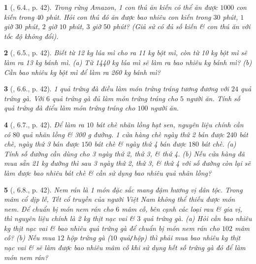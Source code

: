 \documentclass{article}
\newtheorem{baitoan}{}
\begin{document}
\begin{baitoan}[\cite{Binh_boi_duong_Toan_7_tap_1}, 6.4., p. 42]
	Trong rừng Amazon, 1 con thú ăn kiến có thể ăn được $1000$ con kiến trong $40$ phút. Hỏi con thú đó ăn được bao nhiêu con kiến trong $30$ phút, $1$ giờ $30$ phút, $2$ giờ $10$ phút, $3$ giờ $50$ phút? (Giả sử có đủ số kiến \& con thú ăn với tốc độ không đổi).
\end{baitoan}

\begin{baitoan}[\cite{Binh_boi_duong_Toan_7_tap_1}, 6.5., p. 42]
	Biết từ {\rm12 kg} lúa mì cho ra {\rm11 kg} bột mì, còn từ {\rm10 kg} bột mì sẽ làm ra {\rm13 kg} bánh mì. (a) Từ {\rm1440 kg} lúa mì sẽ làm ra bao nhiêu {\rm kg} bánh mì? (b) Cần bao nhiêu {\rm kg} bột mì để làm ra {\rm260 kg} bánh mì?
\end{baitoan}

\begin{baitoan}[\cite{Binh_boi_duong_Toan_7_tap_1}, 6.6., p. 42]
	1 quả trứng đà điều làm món trứng tráng tương đương với $24$ quả trứng gà. Với $6$ quả trứng gà đủ làm món trứng tráng cho $5$ người ăn. Tính số quả trứng đà điểu làm món trứng tráng cho $100$ người ăn.
\end{baitoan}

\begin{baitoan}[\cite{Binh_boi_duong_Toan_7_tap_1}, 6.7., p. 42]
	Để làm ra $10$ bát chè nhãn lồng hạt sen, nguyên liệu chính cần có $80$ quả nhãn lồng \& {\rm300 g} đường. 1 cửa hàng chè ngày thứ 2 bán được $240$ bát chè, ngày thứ 3 bán được $150$ bát chè \& ngày thứ 4 bán được $180$ bát chè. (a) Tính số đường cần dùng cho 3 ngày thứ 2, thứ 3, \& thứ 4. (b) Nếu cửa hàng đã mua sẵn {\rm21 kg} đường thì sau 3 ngày thứ 2, thứ 3, \& thứ 4 với số đường còn lại sẽ làm được bao nhiêu bát chè \& cần sử dụng bao nhiêu quả nhãn lồng?
\end{baitoan}

\begin{baitoan}[\cite{Binh_boi_duong_Toan_7_tap_1}, 6.8., p. 42]
	Nem rán là 1 món đặc sắc mang đậm hương vị dân tộc. Trong mâm cổ dịp lễ, Tết cổ truyền của người Việt Nam không thể thiếu được món nem. Để chuẩn bị món nem rán cho $6$ mâm cỗ, bên cạnh các loại rau \& gia vị, thì nguyên liệu chính là {\rm2 kg} thịt nạc vai \& $3$ quả trứng gà. (a) Hỏi cần bao nhiêu {\rm kg} thịt nạc vai \& bao nhiêu quả trứng gà để chuẩn bị món nem rán cho $102$ mâm cỗ? (b) Nếu mua $12$ hộp trứng gà ($10$ quả{\tt/}hộp) thì phải mua bao nhiêu {\rm kg} thịt nạc vai \& sẽ làm được bao nhiêu mâm cỗ khi sử dụng hết số trứng gà đó để làm món nem rán?
\end{baitoan}
\end{document}
